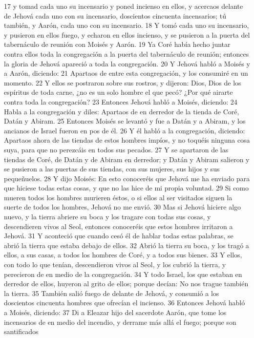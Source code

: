 17 y tomad cada uno su incensario y poned incienso en ellos, y acercaos delante de Jehová cada uno con su incensario, doscientos cincuenta incensarios; tú también, y Aarón, cada uno con su incensario.
18 Y tomó cada uno su incensario, y pusieron en ellos fuego, y echaron en ellos incienso, y se pusieron a la puerta del tabernáculo de reunión con Moisés y Aarón.
19 Ya Coré había hecho juntar contra ellos toda la congregación a la puerta del tabernáculo de reunión; entonces la gloria de Jehová apareció a toda la congregación.
20 Y Jehová habló a Moisés y a Aarón, diciendo:
21 Apartaos de entre esta congregación, y los consumiré en un momento.
22 Y ellos se postraron sobre sus rostros, y dijeron: Dios, Dios de los espíritus de toda carne, ¿no es un solo hombre el que pecó? ¿Por qué airarte contra toda la congregación?
23 Entonces Jehová habló a Moisés, diciendo:
24 Habla a la congregación y diles: Apartaos de en derredor de la tienda de Coré, Datán y Abiram.
25 Entonces Moisés se levantó y fue a Datán y a Abiram, y los ancianos de Israel fueron en pos de él.
26 Y él habló a la congregación, diciendo: Apartaos ahora de las tiendas de estos hombres impíos, y no toquéis ninguna cosa suya, para que no perezcáis en todos sus pecados.
27 Y se apartaron de las tiendas de Coré, de Datán y de Abiram en derredor; y Datán y Abiram salieron y se pusieron a las puertas de sus tiendas, con sus mujeres, sus hijos y sus pequeñuelos.
28 Y dijo Moisés: En esto conoceréis que Jehová me ha enviado para que hiciese todas estas cosas, y que no las hice de mi propia voluntad.
29 Si como mueren todos los hombres murieren éstos, o si ellos al ser visitados siguen la suerte de todos los hombres, Jehová no me envió.
30 Mas si Jehová hiciere algo nuevo, y la tierra abriere su boca y los tragare con todas sus cosas, y descendieren vivos al Seol, entonces conoceréis que estos hombres irritaron a Jehová.
31 Y aconteció que cuando cesó él de hablar todas estas palabras, se abrió la tierra que estaba debajo de ellos.
32 Abrió la tierra su boca, y los tragó a ellos, a sus casas, a todos los hombres de Coré, y a todos sus bienes.
33 Y ellos, con todo lo que tenían, descendieron vivos al Seol, y los cubrió la tierra, y perecieron de en medio de la congregación.
34 Y todo Israel, los que estaban en derredor de ellos, huyeron al grito de ellos; porque decían: No nos trague también la tierra. 
35 También salió fuego de delante de Jehová, y consumió a los doscientos cincuenta hombres que ofrecían el incienso.
36 Entonces Jehová habló a Moisés, diciendo:
37 Di a Eleazar hijo del sacerdote Aarón, que tome los incensarios de en medio del incendio, y derrame más allá el fuego; porque son santificados
